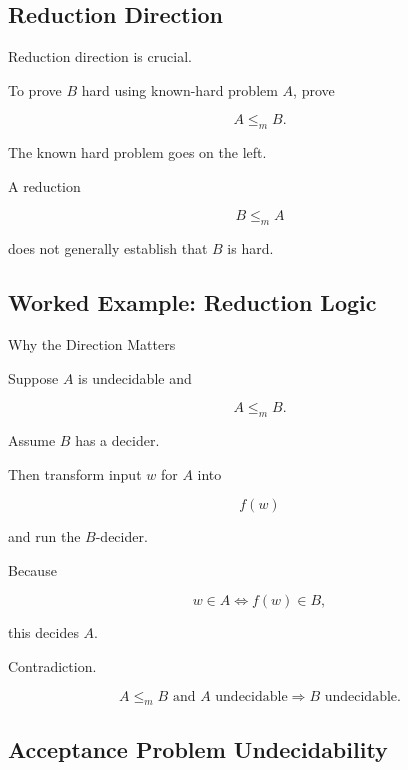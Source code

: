 \subsection{Reduction Direction}
\label{subsec:reduction-direction}

Reduction direction is crucial.

To prove \(B\) hard using known-hard problem \(A\), prove

\[
\boxed{
A
\leq_m
B.
}
\]

The known hard problem goes on the left.

A reduction

\[
B\leq_m A
\]

does not generally establish that \(B\) is hard.

\subsection{Worked Example: Reduction Logic}
\label{subsec:worked-reduction-logic}

\begin{workedexamplebox}{Why the Direction Matters}

Suppose \(A\) is undecidable and

\[
A\leq_m B.
\]

Assume \(B\) has a decider.

Then transform input \(w\) for \(A\) into

\[
f(w)
\]

and run the \(B\)-decider.

Because

\[
w\in A
\iff
f(w)\in B,
\]

this decides \(A\).

Contradiction.

\begin{answerbox}
\[
\boxed{
A\leq_m B
\text{ and }
A
\text{ undecidable}
\Longrightarrow
B
\text{ undecidable}.
}
\]
\end{answerbox}

\end{workedexamplebox}

\subsection{Acceptance Problem Undecidability}
\label{subsec:acceptance-undecidability}

